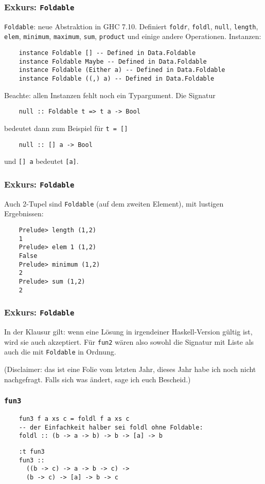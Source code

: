 \documentclass{beamer}
\begin{document}
\begin{frame}[fragile]
  \frametitle{Exkurs: \lstinline{Foldable}}
  \lstinline{Foldable}: neue Abstraktion in GHC 7.10.
  Definiert
  \lstinline{foldr}, \lstinline{foldl},
  \lstinline{null}, \lstinline{length}, \lstinline{elem},
  \lstinline{minimum}, \lstinline{maximum}, \lstinline{sum}, \lstinline{product}
  und einige andere Operationen.
  Instanzen:
  \begin{lstlisting}
    instance Foldable [] -- Defined in Data.Foldable
    instance Foldable Maybe -- Defined in Data.Foldable
    instance Foldable (Either a) -- Defined in Data.Foldable
    instance Foldable ((,) a) -- Defined in Data.Foldable
  \end{lstlisting}
  Beachte: allen Instanzen fehlt noch ein Typargument.
  Die Signatur
  \begin{lstlisting}
    null :: Foldable t => t a -> Bool
  \end{lstlisting}
  bedeutet dann zum Beispiel für \lstinline{t = []}
  \begin{lstlisting}
    null :: [] a -> Bool
  \end{lstlisting}
  und \lstinline{[] a} bedeutet \lstinline{[a]}.
\end{frame}

\begin{frame}[fragile]
  \frametitle{Exkurs: \lstinline{Foldable}}
  Auch 2-Tupel sind \lstinline{Foldable} (auf dem zweiten Element),
  mit lustigen Ergebnissen:
  \begin{lstlisting}
    Prelude> length (1,2)
    1
    Prelude> elem 1 (1,2)
    False
    Prelude> minimum (1,2)
    2
    Prelude> sum (1,2)
    2
  \end{lstlisting}
\end{frame}

\begin{frame}
  \frametitle{Exkurs: \lstinline{Foldable}}
  In der Klausur gilt:
  wenn eine Lösung in irgendeiner Haskell-Version gültig ist,
  wird sie auch akzeptiert.
  Für \lstinline{fun2} wären also sowohl die Signatur mit Liste als auch die mit \lstinline{Foldable} in Ordnung.
  
  (Disclaimer: das ist eine Folie vom letzten Jahr, dieses Jahr habe ich noch nicht nachgefragt.
  Falls sich was ändert, sage ich euch Bescheid.)
\end{frame}

\begin{frame}[fragile]
  \frametitle{\lstinline{fun3}}
  \begin{lstlisting}
    fun3 f a xs c = foldl f a xs c
    -- der Einfachkeit halber sei foldl ohne Foldable:
    foldl :: (b -> a -> b) -> b -> [a] -> b
  \end{lstlisting}
  \pause
  \begin{lstlisting}
    :t fun3
    fun3 ::
      ((b -> c) -> a -> b -> c) ->
      (b -> c) -> [a] -> b -> c
  \end{lstlisting}
\end{frame}
\end{document}

